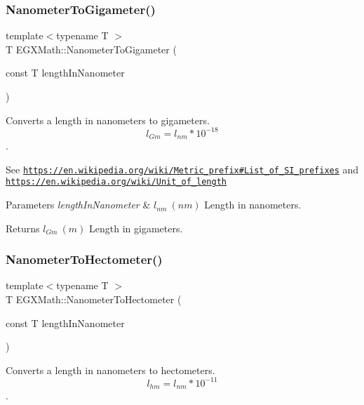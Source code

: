 \subsubsection{\texorpdfstring{Nanometer\+To\+Gigameter()}{NanometerToGigameter()}}
{\footnotesize\ttfamily template$<$typename T $>$ \\
T E\+G\+X\+Math\+::\+Nanometer\+To\+Gigameter (\begin{DoxyParamCaption}\item[{const T}]{length\+In\+Nanometer }\end{DoxyParamCaption})}



Converts a length in nanometers to gigameters. \[ l_{Gm}=l_{nm} * 10^{-18} \]. 

See \href{https://en.wikipedia.org/wiki/Metric_prefix#List_of_SI_prefixes}{\tt https\+://en.\+wikipedia.\+org/wiki/\+Metric\+\_\+prefix\#\+List\+\_\+of\+\_\+\+S\+I\+\_\+prefixes} and \href{https://en.wikipedia.org/wiki/Unit_of_length}{\tt https\+://en.\+wikipedia.\+org/wiki/\+Unit\+\_\+of\+\_\+length} 
\begin{DoxyParams}{Parameters}
{\em length\+In\+Nanometer} & $ l_{nm}\ (nm)$ Length in nanometers. \\
\hline
\end{DoxyParams}
\begin{DoxyReturn}{Returns}
$ l_{Gm}\ (m)$ Length in gigameters. 
\end{DoxyReturn}
\mbox{\label{group___e_g_x_math-_conversions-_length_conversions-_nanometer-_s_i_ga106931c80902a638a38099d2fe2ba99e}} 
\subsubsection{\texorpdfstring{Nanometer\+To\+Hectometer()}{NanometerToHectometer()}}
{\footnotesize\ttfamily template$<$typename T $>$ \\
T E\+G\+X\+Math\+::\+Nanometer\+To\+Hectometer (\begin{DoxyParamCaption}\item[{const T}]{length\+In\+Nanometer }\end{DoxyParamCaption})}



Converts a length in nanometers to hectometers. \[ l_{hm}=l_{nm} * 10^{-11} \]. 

